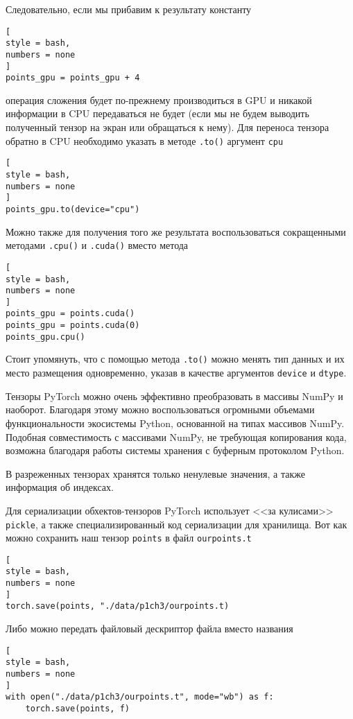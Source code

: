 \documentclass[%
	11pt,
	a4paper,
	utf8,
		]{article}
\begin{document}
Следовательно, если мы прибавим к результату константу
\begin{lstlisting}[
style = bash,
numbers = none
]
points_gpu = points_gpu + 4
\end{lstlisting}
операция сложения будет по-прежнему производиться в GPU и никакой информации в CPU передаваться не будет (если мы не будем выводить полученный тензор на экран или обращаться к нему). Для переноса тензора обратно в CPU необходимо указать в методе \verb|.to()| аргумент \verb|cpu|
\begin{lstlisting}[
style = bash,
numbers = none
]
points_gpu.to(device="cpu")
\end{lstlisting}

Можно также для получения того же результата воспользоваться сокращенными методами \verb|.cpu()| и \verb|.cuda()| вместо метода 
\begin{lstlisting}[
style = bash,
numbers = none
]
points_gpu = points.cuda()
points_gpu = points.cuda(0)
points_gpu.cpu()
\end{lstlisting}

Стоит упомянуть, что с помощью метода \verb|.to()| можно менять тип данных и их место размещения одновременно, указав в качестве аргументов \verb|device| и \verb|dtype|.

Тензоры PyTorch можно очень эффективно преобразовать в массивы NumPy и наоборот. Благодаря этому можно воспользоваться огромными объемами функциональности экосистемы Python, основанной на типах массивов NumPy. Подобная совместимость с массивами NumPy, не требующая копирования кода, возможна благодаря работы системы хранения с буферным протоколом Python.

В разреженных тензорах хранятся только ненулевые значения, а также информация об индексах.

Для сериализации обхектов-тензоров PyTorch использует <<за кулисами>> \verb|pickle|, а также специализированный код сериализации для хранилища. Вот как можно сохранить наш тензор \verb|points| в файл \verb|ourpoints.t|
\begin{lstlisting}[
style = bash,
numbers = none
]
torch.save(points, "./data/p1ch3/ourpoints.t)
\end{lstlisting}

Либо можно передать файловый дескриптор файла вместо названия
\begin{lstlisting}[
style = bash,
numbers = none
]
with open("./data/p1ch3/ourpoints.t", mode="wb") as f:
    torch.save(points, f)
\end{lstlisting}
\end{document}
